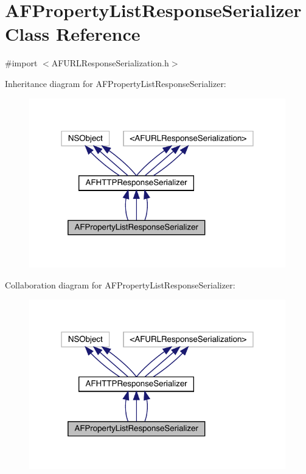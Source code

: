 \hypertarget{interface_a_f_property_list_response_serializer}{}\section{A\+F\+Property\+List\+Response\+Serializer Class Reference}
\label{interface_a_f_property_list_response_serializer}


{\ttfamily \#import $<$A\+F\+U\+R\+L\+Response\+Serialization.\+h$>$}



Inheritance diagram for A\+F\+Property\+List\+Response\+Serializer\+:\nopagebreak
\begin{figure}[H]
\begin{center}
\leavevmode
\includegraphics[width=316pt]{interface_a_f_property_list_response_serializer__inherit__graph}
\end{center}
\end{figure}


Collaboration diagram for A\+F\+Property\+List\+Response\+Serializer\+:\nopagebreak
\begin{figure}[H]
\begin{center}
\leavevmode
\includegraphics[width=316pt]{interface_a_f_property_list_response_serializer__coll__graph}
\end{center}
\end{figure}
